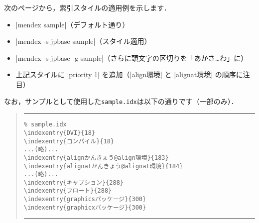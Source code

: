 \documentclass[a4paper,dvipdfmx]{jsarticle}
\newcommand{\FileName}[1]{\texttt{#1}}
\begin{document}
次のページから，索引スタイルの適用例を示します．
\begin{itemize}
 \item |mendex sample|（デフォルト通り）
 \item |mendex -s jpbase sample|（スタイル適用）
 \item |mendex -s jpbase -g sample|（さらに頭文字の区切りを「あかさ…わ」に）
 \item 上記スタイルに |priority 1| を追加（|align環境| と |alignat環境| の順序に注目）
\end{itemize}
なお，サンプルとして使用した\FileName{sample.idx}は以下の通りです（一部のみ）．
\begin{quote}
\hrule\vskip10pt\noautospacing\noautoxspacing
\begin{verbatim}
% sample.idx
\indexentry{DVI}{18}
\indexentry{コンパイル}{18}
...(略)...
\indexentry{alignかんきょう@align環境}{183}
\indexentry{alignatかんきょう@alignat環境}{184}
...(略)...
\indexentry{キャプション}{288}
\indexentry{フロート}{288}
\indexentry{graphicsパッケージ}{300}
\indexentry{graphicxパッケージ}{300}
\end{verbatim}
\vskip10pt\hrule
\end{quote}

\def\indexname{索引（\texttt{mendex}デフォルト）}
\def\indexname{索引（\texttt{mendex -s jpbase}）}
\def\indexname{索引（\texttt{mendex -s jpbase -g}）}
\def\indexname{索引（スタイルに\texttt{priority 1}を追加）}
\end{document}
